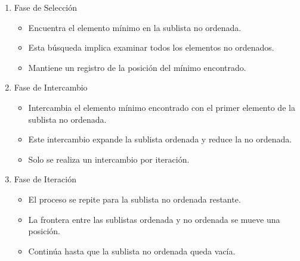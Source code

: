 \begin{enumerate}
    \item Fase de Selección
    \begin{itemize}
        \item Encuentra el elemento mínimo en la sublista no ordenada.
        \item Esta búsqueda implica examinar todos los elementos no ordenados.
        \item Mantiene un registro de la posición del mínimo encontrado.
    \end{itemize}

    \item Fase de Intercambio
    \begin{itemize}
        \item Intercambia el elemento mínimo encontrado con el primer elemento de la sublista no ordenada.
        \item Este intercambio expande la sublista ordenada y reduce la no ordenada.
        \item Solo se realiza un intercambio por iteración.
    \end{itemize}
\vspace{2cm}

    \item Fase de Iteración
    \begin{itemize}
        \item El proceso se repite para la sublista no ordenada restante.
        \item La frontera entre las sublistas ordenada y no ordenada se mueve una posición.
        \item Continúa hasta que la sublista no ordenada queda vacía.
    \end{itemize}
\end{enumerate}

